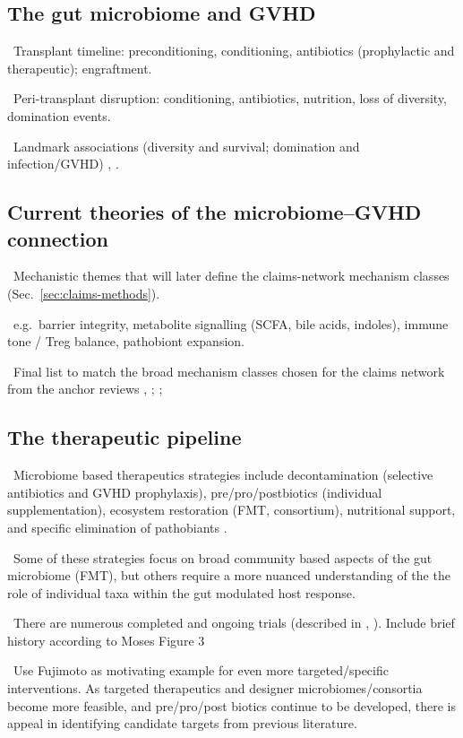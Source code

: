 \documentclass[11pt,a4paper]{article}
\newcommand{\todoitem}[1]{\par\noindent\textcolor{blue!70!black}{\textbullet~#1}}
\begin{document}
\subsection*{The gut microbiome and GVHD}
\todoitem{Transplant timeline: preconditioning, conditioning, antibiotics (prophylactic and therapeutic); engraftment.}
\todoitem{Peri-transplant disruption: conditioning, antibiotics, nutrition, loss of diversity, domination events.}
\todoitem{Landmark associations (diversity and survival; domination and infection/GVHD) \cite{jenq2012regulation-65d} \cite{taur2015role-b42}, \cite{blautiajenq2015}.}

\subsection*{Current theories of the microbiome--GVHD connection}
\todoitem{Mechanistic themes that will later define the claims-network mechanism classes (Sec.~\ref{sec:claims-methods}).}
\todoitem{e.g.\ barrier integrity, metabolite signalling (SCFA, bile acids, indoles), immune tone / Treg balance, pathobiont expansion.}
\todoitem{Final list to match the broad mechanism classes chosen for the claims network from the anchor reviews \cite{paredes2026intestinal-400}, \cite{samarkhazan2025microbiome-4bd}; \cite{weber2026microbiome-023}; \cite{moses2026gut-cdb}}


\subsection*{The therapeutic pipeline}
\todoitem{Microbiome based therapeutics strategies include decontamination (selective antibiotics and GVHD prophylaxis), pre/pro/postbiotics (individual supplementation), ecosystem restoration (FMT, consortium), nutritional support, and specific elimination of pathobiants \cite{moses2026gut-cdb} \cite{paredes2026intestinal-400} \cite{Fujimoto2024}.}
\todoitem{Some of these strategies focus on broad community based aspects of the gut microbiome (FMT), but others require a more nuanced understanding of the the role of individual taxa within the gut modulated host response. }
\todoitem{There are numerous completed and ongoing trials (described in \cite{paredes2026intestinal-400}, \cite{moses2026gut-cdb}). Include brief history according to Moses Figure 3}
\todoitem{Use Fujimoto \cite{Fujimoto2024} as motivating example for even more targeted/specific interventions. As targeted therapeutics and designer microbiomes/consortia become more feasible, and pre/pro/post biotics continue to be developed, there is appeal in identifying candidate targets from previous literature.}
\end{document}
